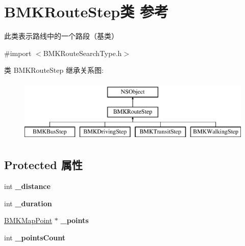 \hypertarget{interface_b_m_k_route_step}{\section{B\+M\+K\+Route\+Step类 参考}
\label{interface_b_m_k_route_step}
}


此类表示路线中的一个路段（基类）  




{\ttfamily \#import $<$B\+M\+K\+Route\+Search\+Type.\+h$>$}

类 B\+M\+K\+Route\+Step 继承关系图\+:\begin{figure}[H]
\begin{center}
\leavevmode
\includegraphics[height=3.000000cm]{interface_b_m_k_route_step}
\end{center}
\end{figure}
\subsection*{Protected 属性}
\begin{DoxyCompactItemize}
\item 
\hypertarget{interface_b_m_k_route_step_ad3cde05d4399b85ec3acd42a7c423c1a}{int {\bfseries \+\_\+distance}}\label{interface_b_m_k_route_step_ad3cde05d4399b85ec3acd42a7c423c1a}

\item 
\hypertarget{interface_b_m_k_route_step_aa51f65db494e87099473478e04bc3e2c}{int {\bfseries \+\_\+duration}}\label{interface_b_m_k_route_step_aa51f65db494e87099473478e04bc3e2c}

\item 
\hypertarget{interface_b_m_k_route_step_a8aa8cc9d1b1c845ecb418fb8ab97f12c}{\hyperlink{struct_b_m_k_map_point}{B\+M\+K\+Map\+Point} $\ast$ {\bfseries \+\_\+points}}\label{interface_b_m_k_route_step_a8aa8cc9d1b1c845ecb418fb8ab97f12c}

\item 
\hypertarget{interface_b_m_k_route_step_aa66e782ce3d4a34af627113e2e41aea1}{int {\bfseries \+\_\+points\+Count}}\label{interface_b_m_k_route_step_aa66e782ce3d4a34af627113e2e41aea1}

\end{DoxyCompactItemize}
